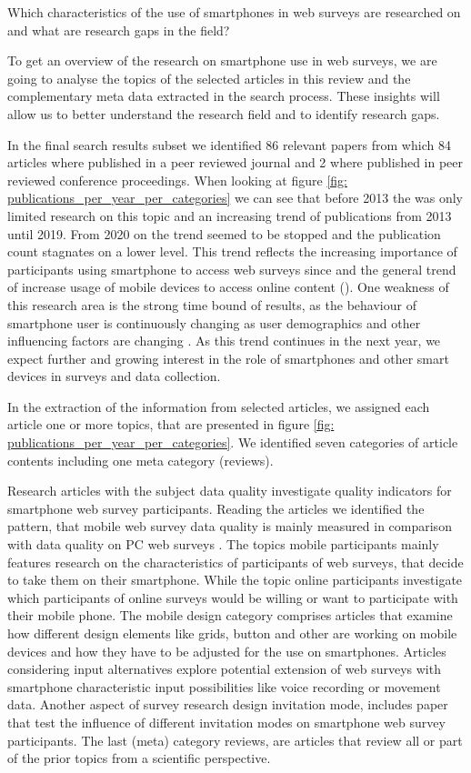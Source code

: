 Which characteristics of the use of smartphones
in web surveys are researched on and what are research gaps in the field?

To get an overview of the research on smartphone use in web surveys, we are going to analyse the topics of the selected articles in this review and the complementary meta data extracted in the search process. These insights will allow us to better understand the research field and to identify research gaps. 

In the final search results subset we identified 86 relevant papers from which 84 articles where published in a peer reviewed journal and 2 where published in peer reviewed conference proceedings. When looking at figure \ref{fig: publications_per_year_per_categories} we can see that before 2013 the was only limited research on this topic and an increasing trend of publications from 2013 until 2019. From 2020 on the trend seemed to be stopped and the publication count stagnates on a lower level. This trend reflects the increasing importance of participants using smartphone to access web surveys since and the general trend of increase usage of mobile devices to access online content (\cite{weigold_computerized_2021}). One weakness of this research area is the strong time bound of results, as the behaviour of smartphone user is continuously changing as user demographics and other influencing factors are changing \cite{broel_desktop_2018}. As this trend continues in the next year, we expect further and growing interest in the role of smartphones and other smart devices in surveys and data collection.  

In the extraction of the information from selected articles, we assigned each article one or more topics, that are presented in figure \ref{fig: publications_per_year_per_categories}. We identified seven categories of article contents including one meta category (reviews). 

Research articles with the subject data quality investigate quality indicators for smartphone web survey participants. Reading the articles we identified the pattern, that mobile web survey data quality is mainly measured in comparison with data quality on PC web surveys \cite{de_bruijne_comparing_2013, ha_data_2020}. The topics mobile participants mainly features research on the characteristics of participants of web surveys, that decide to take them on their smartphone. While the topic online participants investigate which participants of online surveys would be willing or want to participate with their mobile phone. The mobile design category comprises articles that examine how different design elements like grids, button and other are working on mobile devices and how they have to be adjusted for the use on smartphones. Articles considering input alternatives explore potential extension of web surveys with smartphone characteristic input possibilities like voice recording or movement data. Another aspect of survey research design invitation mode, includes paper that test the influence of different invitation modes on smartphone web survey participants. The last (meta) category reviews, are articles that review all or part of the prior topics from a scientific perspective. 

